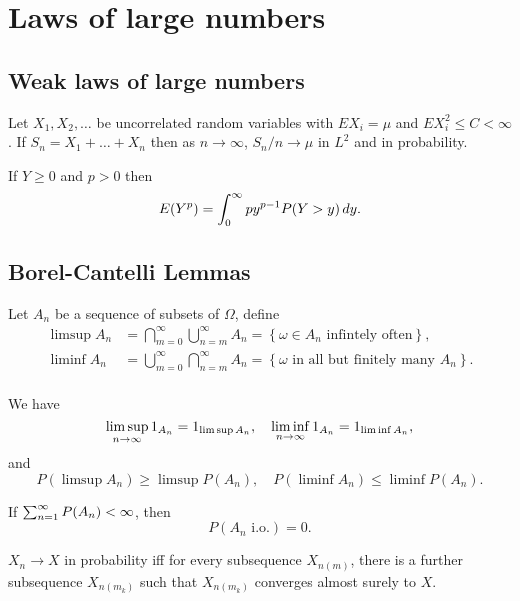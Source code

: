 \documentclass[a4paper]{article}
\begin{document}
\maketitle

\setcounter{section}{1}
\section{Laws of large numbers}

\setcounter{subsection}{1}

\subsection{Weak laws of large numbers}
\begin{thm}
Let $X_1, X_2, \dots$ be uncorrelated random variables with $EX_i = \mu$
and $E X_i^2 \leq C < \infty$. If $S_n = X_1 + \dots + X_n$ then 
as $n \to \infty$, $S_n / n \to \mu$ in $L^2$ and in probability.
\end{thm}


\begin{lemma}
  If $Y \geq 0$ and $p > 0$ then 
  \[
  E(Y^p) = \int_0^\infty p y^{p - 1} P(Y > y) \, d y.
  \]
\end{lemma}

\subsection{Borel-Cantelli Lemmas}

\begin{defi}
  Let $A_n$ be a sequence of subsets of $\Omega$, define 
  \[
  \begin{aligned}
    \limsup A_n 
    &= \bigcap_{m = 0}^\infty \bigcup_{n = m}^\infty A_n 
    = \left\{ \omega \in A_n \text{ infintely often} \right\}, \\
    \liminf A_n 
    &= \bigcup_{m = 0}^\infty \bigcap_{n = m}^\infty A_n 
    = \left\{ \text{$\omega$ in all but finitely many $A_n$} \right\}. \\
  \end{aligned}
  \]
\end{defi}

\begin{prop}
  We have 
  \[
  \limsup_{n \to \infty} 1_{A_n} = 1_{\limsup A_n}, \quad 
  \liminf_{n \to \infty} 1_{A_n} = 1_{\liminf A_n},
  \]
  and 
  \[
  P(\limsup A_n) \geq \limsup P(A_n), \quad 
  P(\liminf A_n) \leq \liminf P(A_n).
  \]
\end{prop}

\begin{thm}
  If $\sum_{n=1}^\infty P(A_n) < \infty$, then 
  \[
  P(A_n \text{ i.o.}) = 0.
  \]
\end{thm}

\begin{thm}
  $X_n \to X$ in probability iff for every subsequence $X_{n(m)}$, there 
  is a further subsequence $X_{n(m_k)}$ such that $X_{n(m_k)}$ converges 
  almost surely to $X$.
\end{thm}
\end{document}

